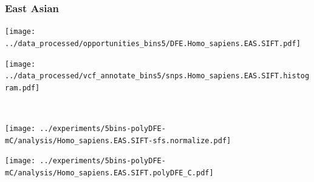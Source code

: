 \subsubsection{East Asian}

\begin{minipage}{0.49\linewidth}
    \texttt{[image: ../data\_processed/opportunities\_bins5/DFE.Homo\_sapiens.EAS.SIFT.pdf]}
\end{minipage}
\begin{minipage}{0.49\linewidth}
    \texttt{[image: ../data\_processed/vcf\_annotate\_bins5/snps.Homo\_sapiens.EAS.SIFT.histogram.pdf]}
\end{minipage}
\\
\begin{minipage}{0.49\linewidth}
    \texttt{[image: ../experiments/5bins-polyDFE-mC/analysis/Homo\_sapiens.EAS.SIFT-sfs.normalize.pdf]}
\end{minipage}
\begin{minipage}{0.4\linewidth}
    \texttt{[image: ../experiments/5bins-polyDFE-mC/analysis/Homo\_sapiens.EAS.SIFT.polyDFE\_C.pdf]}
\end{minipage}
